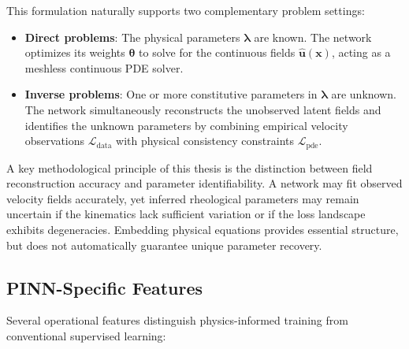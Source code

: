 This formulation naturally supports two complementary problem settings:
\begin{itemize}
    \item \textbf{Direct problems}:
    The physical parameters $\boldsymbol{\lambda}$ are known.
    The network optimizes its weights $\boldsymbol{\theta}$ to solve for the continuous fields $\hat{\boldsymbol{u}}(\boldsymbol{x})$,
    acting as a meshless continuous PDE solver.
    \item \textbf{Inverse problems}:
    One or more constitutive parameters in $\boldsymbol{\lambda}$ are unknown.
    The network simultaneously reconstructs the unobserved latent fields
    and identifies the unknown parameters by combining empirical velocity observations $\mathcal{L}_{\mathrm{data}}$
    with physical consistency constraints $\mathcal{L}_{\mathrm{pde}}$.
\end{itemize}

A key methodological principle of this thesis is the distinction between
field reconstruction accuracy and parameter identifiability.
A network may fit observed velocity fields accurately,
yet inferred rheological parameters may remain uncertain if the kinematics lack sufficient variation
or if the loss landscape exhibits degeneracies.
Embedding physical equations provides essential structure,
but does not automatically guarantee unique parameter recovery.

\subsection{PINN-Specific Features}
\label{subsec:deep_dive_training}

Several operational features distinguish physics-informed training from conventional supervised learning:

